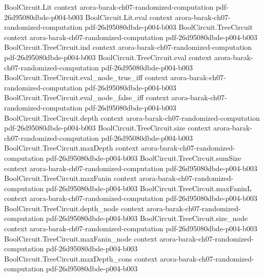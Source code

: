 \begin{theorem}
\label{Randomized.BPTIMEWith_two_thirds}
\leanok
{}
\proofstep
  {BoolCircuit.Lit}
  {context}
  {arora-barak-ch07-randomized-computation}
  {pdf-26d95080dbde-p004-b003}
\proofstep
  {BoolCircuit.Lit.eval}
  {context}
  {arora-barak-ch07-randomized-computation}
  {pdf-26d95080dbde-p004-b003}
\proofstep
  {BoolCircuit.TreeCircuit}
  {context}
  {arora-barak-ch07-randomized-computation}
  {pdf-26d95080dbde-p004-b003}
\proofstep
  {BoolCircuit.TreeCircuit.ind}
  {context}
  {arora-barak-ch07-randomized-computation}
  {pdf-26d95080dbde-p004-b003}
\proofstep
  {BoolCircuit.TreeCircuit.eval}
  {context}
  {arora-barak-ch07-randomized-computation}
  {pdf-26d95080dbde-p004-b003}
\proofstep
  {BoolCircuit.TreeCircuit.eval_node_true_iff}
  {context}
  {arora-barak-ch07-randomized-computation}
  {pdf-26d95080dbde-p004-b003}
\proofstep
  {BoolCircuit.TreeCircuit.eval_node_false_iff}
  {context}
  {arora-barak-ch07-randomized-computation}
  {pdf-26d95080dbde-p004-b003}
\proofstep
  {BoolCircuit.TreeCircuit.depth}
  {context}
  {arora-barak-ch07-randomized-computation}
  {pdf-26d95080dbde-p004-b003}
\proofstep
  {BoolCircuit.TreeCircuit.size}
  {context}
  {arora-barak-ch07-randomized-computation}
  {pdf-26d95080dbde-p004-b003}
\proofstep
  {BoolCircuit.TreeCircuit.maxDepth}
  {context}
  {arora-barak-ch07-randomized-computation}
  {pdf-26d95080dbde-p004-b003}
\proofstep
  {BoolCircuit.TreeCircuit.sumSize}
  {context}
  {arora-barak-ch07-randomized-computation}
  {pdf-26d95080dbde-p004-b003}
\proofstep
  {BoolCircuit.TreeCircuit.maxFanin}
  {context}
  {arora-barak-ch07-randomized-computation}
  {pdf-26d95080dbde-p004-b003}
\proofstep
  {BoolCircuit.TreeCircuit.maxFaninL}
  {context}
  {arora-barak-ch07-randomized-computation}
  {pdf-26d95080dbde-p004-b003}
\proofstep
  {BoolCircuit.TreeCircuit.depth_node}
  {context}
  {arora-barak-ch07-randomized-computation}
  {pdf-26d95080dbde-p004-b003}
\proofstep
  {BoolCircuit.TreeCircuit.size_node}
  {context}
  {arora-barak-ch07-randomized-computation}
  {pdf-26d95080dbde-p004-b003}
\proofstep
  {BoolCircuit.TreeCircuit.maxFanin_node}
  {context}
  {arora-barak-ch07-randomized-computation}
  {pdf-26d95080dbde-p004-b003}
\proofstep
  {BoolCircuit.TreeCircuit.maxDepth_cons}
  {context}
  {arora-barak-ch07-randomized-computation}
  {pdf-26d95080dbde-p004-b003}

\end{theorem}
